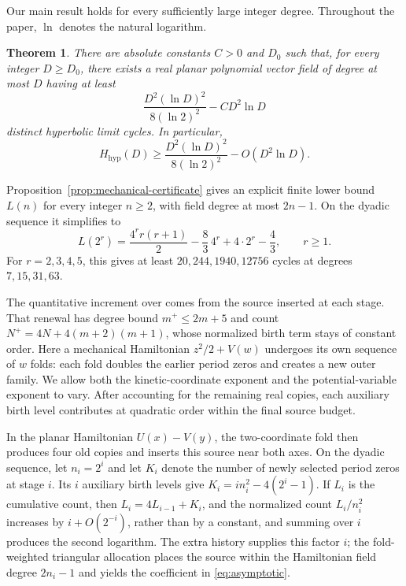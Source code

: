 \documentclass[11pt]{article}
\numberwithin{equation}{section}
\newtheorem{theorem}{Theorem}[section]
\theoremstyle{definition}
\theoremstyle{remark}
\newcommand{\Hhyp}{H_{\mathrm{hyp}}}
\begin{document}
Our main result holds for every sufficiently large integer degree.
Throughout the paper, $\ln$ denotes the natural logarithm.

\begin{theorem}\label{thm:main}
There are absolute constants $C>0$ and $D_0$ such that, for every
integer $D\ge D_0$, there exists a real planar polynomial vector field
of degree at most $D$ having at least
\[
 \frac{D^2(\ln D)^2}{8(\ln2)^2}-CD^2\ln D
\]
distinct hyperbolic limit cycles. In particular,
\begin{equation}\label{eq:asymptotic}
 \Hhyp(D)\ge
 \frac{D^2(\ln D)^2}{8(\ln2)^2}-O(D^2\ln D).
\end{equation}
\end{theorem}

Proposition~\ref{prop:mechanical-certificate} gives an explicit finite lower bound
$L(n)$ for every integer $n\ge2$, with field degree at most $2n-1$.
On the dyadic sequence it simplifies to
\begin{equation}\label{eq:dyadic}
 L(2^r)=\frac{4^r r(r+1)}2-\frac83\,4^r+4\cdot2^r-\frac43,
 \qquad r\ge1.
\end{equation}
For $r=2,3,4,5$, this gives at least $20,244,1940,12756$
cycles at degrees $7,15,31,63$.

The quantitative increment over \cite[Proposition~4.1]{Lu2026} comes
from the source inserted at each stage. That renewal has degree bound $m^+\le2m+5$
and count $N^+=4N+4(m+2)(m+1)$, whose normalized birth term stays of
constant order. Here a mechanical Hamiltonian $z^2/2+V(w)$ undergoes
its own sequence of $w$ folds: each fold doubles the earlier period
zeros and creates a new outer family. We allow both the kinetic-coordinate exponent
and the potential-variable exponent to vary. After accounting for the
remaining real copies, each auxiliary birth level contributes at
quadratic order within the final source budget.

In the planar Hamiltonian $U(x)-V(y)$, the two-coordinate fold then
produces four old copies and inserts this source near both axes.
On the dyadic sequence, let $n_i=2^i$ and let $K_i$ denote the number
of newly selected period zeros at stage $i$. Its $i$ auxiliary birth levels give
$K_i=i n_i^2-4(2^i-1)$. If $L_i$ is the cumulative count, then $L_i=4L_{i-1}+K_i$, and
the normalized count $L_i/n_i^2$ increases by
$i+O(2^{-i})$, rather than by a constant, and summing over $i$ produces
the second logarithm. The extra history supplies this factor $i$;
the fold-weighted triangular allocation places the source within the
Hamiltonian field degree $2n_i-1$ and yields the coefficient in
\eqref{eq:asymptotic}.
\end{document}
